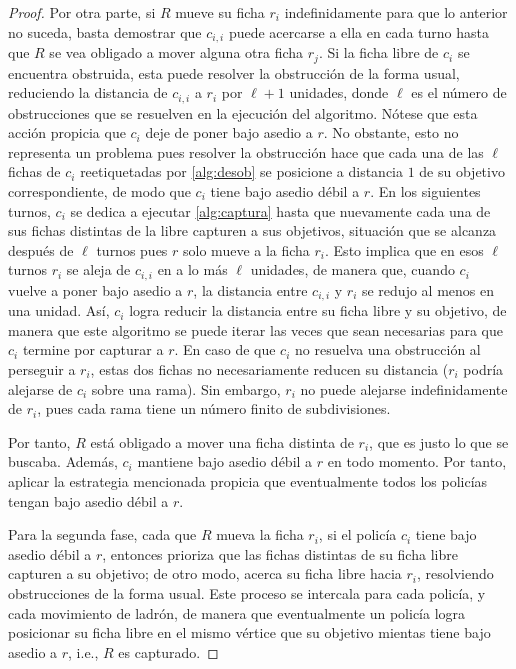 \begin{proof}
    Por otra parte, si $R$ mueve su ficha $r_i$ indefinidamente para que lo
    anterior no suceda, basta demostrar que $c_{i,i}$ puede acercarse a ella en
    cada turno hasta que $R$ se vea obligado a mover alguna otra ficha $r_j$. Si
    la ficha libre de $c_i$ se encuentra obstruida, esta puede resolver la
    obstrucci\'on de la forma usual, reduciendo la distancia de $c_{i,i}$ a
    $r_i$ por $\ell+1$ unidades, donde $\ell$ es el n\'umero de obstrucciones
    que se resuelven en la ejecuci\'on del algoritmo. N\'otese que esta acci\'on
    propicia que $c_i$ deje de poner bajo asedio a $r$. No obstante, esto no
    representa un problema pues resolver la obstrucci\'on hace que cada una de
    las $\ell$ fichas de $c_i$ reetiquetadas por \cref{alg:desob} se posicione a
    distancia $1$ de su objetivo correspondiente, de modo que $c_i$ tiene bajo
    asedio d\'ebil a $r$. En los siguientes turnos, $c_i$ se dedica a ejecutar
    \cref{alg:captura} hasta que nuevamente cada una de sus fichas distintas de
    la libre capturen a sus objetivos, situaci\'on que se alcanza despu\'es de
    $\ell$ turnos pues $r$ solo mueve a la ficha $r_i$. Esto implica que en esos
    $\ell$ turnos $r_i$ se aleja de $c_{i,i}$ en a lo m\'as $\ell$ unidades, de
    manera que, cuando $c_i$ vuelve a poner bajo asedio a $r$, la distancia
    entre $c_{i,i}$ y $r_i$ se redujo al menos en una unidad. As\'i, $c_i$ logra
    reducir la distancia entre su ficha libre y su objetivo, de manera que este
    algoritmo se puede iterar las veces que sean necesarias para que $c_i$
    termine por capturar a $r$.  En caso de que $c_i$ no resuelva una
    obstrucci\'on al perseguir a $r_i$, estas dos fichas no necesariamente
    reducen su distancia ($r_i$ podr\'ia alejarse de $c_i$ sobre una rama). Sin
    embargo, $r_i$ no puede alejarse indefinidamente de $r_i$, pues cada rama
    tiene un n\'umero finito de subdivisiones.

    Por tanto, $R$ est\'a obligado a mover una ficha distinta de $r_i$, que es
    justo lo que se buscaba. Adem\'as, $c_i$ mantiene bajo asedio d\'ebil a $r$
    en todo momento. Por tanto, aplicar la estrategia mencionada propicia que
    eventualmente todos los polic\'ias tengan bajo asedio d\'ebil a $r$.

    \newpage

    Para la segunda fase, cada que $R$ mueva la ficha $r_i$, si el polic\'ia
    $c_i$ tiene bajo asedio d\'ebil a $r$, entonces prioriza que las fichas
    distintas de su ficha libre capturen a su objetivo; de otro modo, acerca su
    ficha libre hacia $r_i$, resolviendo obstrucciones de la forma usual. Este
    proceso se intercala para cada polic\'ia, y cada movimiento de ladr\'on, de
    manera que eventualmente un polic\'ia logra posicionar su ficha libre en el
    mismo v\'ertice que su objetivo mientas tiene bajo asedio a $r$, i.e., $R$
    es capturado.

\end{proof}

